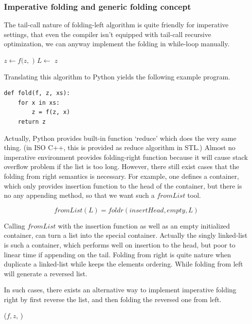 \documentclass[b5paper]{article}
\begin{document}
\subsubsection{Imperative folding and generic folding concept}
The tail-call nature of folding-left algorithm is quite friendly for imperative settings, that even the compiler
isn't equipped with tail-call recursive optimization, we can anyway implement the folding in while-loop manually.

\begin{algorithmic}[1]
    \State $z \gets f(z, $  $)$
    \State $L \gets$ 
  \EndWhile
  \State \Return $z$
\EndFunction
\end{algorithmic}

Translating this algorithm to Python yields the following example program.

\lstset{language=Python}
\begin{lstlisting}
def fold(f, z, xs):
    for x in xs:
        z = f(z, x)
    return z
\end{lstlisting}

Actually, Python provides built-in function `reduce' which does the very same thing. (in ISO C++, this is
provided as reduce algorithm in STL.) Almost no imperative environment provides folding-right function because
it will cause stack overflow problem if the list is too long. However, there still exist cases that the folding from right
semantics is necessary. For example, one defines a container, which only provides insertion function to
the head of the container, but there is no any appending method, so that we want such a $fromList$
tool.

\[
fromList(L) = foldr(insertHead, empty, L)
\]

Calling $fromList$ with the insertion function as well as an empty initialized container, can turn a list
into the special container. Actually the singly linked-list is such a container, which performs well
on insertion to the head, but poor to linear time if appending on the tail. Folding from right is quite
nature when duplicate a linked-list while keeps the elements ordering. While folding from left will generate
a reversed list.

In such cases, there exists an alternative way to implement imperative folding right by first reverse the list, and then
folding the reversed one from left.

\begin{algorithmic}[1]
  \State \Return {}($f, z$, )
\EndFunction
\end{algorithmic}
\end{document}
